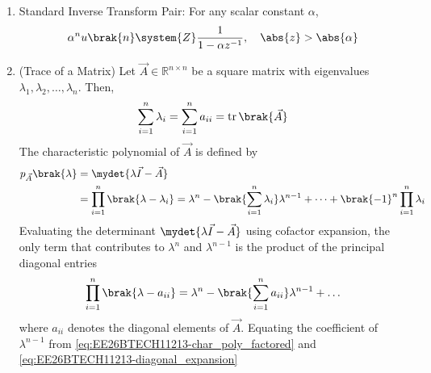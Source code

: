 \begin{enumerate}[label=\thesubsection.\arabic*, ref=\thesubsection.\theenumi,itemsep=0pt]
\item Standard Inverse Transform Pair:
For any scalar constant $\alpha$,
\begin{align}
\alpha^n u\brak{n}\system{Z}\frac{1}{1 - \alpha z^{-1}}, \quad \abs{z} > \abs{\alpha} \label{eq:EE26BTECH11213-z_inv_exponential}
\end{align}
%
\item (Trace of a Matrix)
Let $\vec{A} \in \mathbb{R}^{n \times n}$ be a square matrix with eigenvalues $\lambda_1, \lambda_2, \dots, \lambda_n$.  Then,
\begin{align}
\sum_{i=1}^n \lambda_i = \sum_{i=1}^n a_{ii} = \operatorname{tr}\brak{\vec{A}} \label{eq:EE26BTECH11213-sum_eigenvalues_trace}
\end{align}
\solution
 The characteristic polynomial of $\vec{A}$ is defined by
\begin{align}
	p_{\vec{A}}\brak{\lambda} &= \mydet{\lambda \vec{I} - \vec{A}} \label{eq:EE26BTECH11213-char_poly_det}
	\\
 &= \prod_{i=1}^n \brak{\lambda - \lambda_i} = \lambda^n - \brak{\sum_{i=1}^n \lambda_i} \lambda^{n-1} + \dots + \brak{-1}^n \prod_{i=1}^n \lambda_i \label{eq:EE26BTECH11213-char_poly_factored}
\end{align}
Evaluating the determinant $\mydet{\lambda \vec{I} - \vec{A}}$ using cofactor expansion, the only term that contributes to $\lambda^n$ and $\lambda^{n-1}$ is the product of the principal diagonal entries
\begin{align}
\prod_{i=1}^n \brak{\lambda - a_{ii}} = \lambda^n - \brak{\sum_{i=1}^n a_{ii}} \lambda^{n-1} + \dots \label{eq:EE26BTECH11213-diagonal_expansion}
\end{align}
where $a_{ii}$ denotes the diagonal elements of $\vec{A}$.
Equating the coefficient of $\lambda^{n-1}$ from \eqref{eq:EE26BTECH11213-char_poly_factored} and \eqref{eq:EE26BTECH11213-diagonal_expansion}
\end{enumerate}
